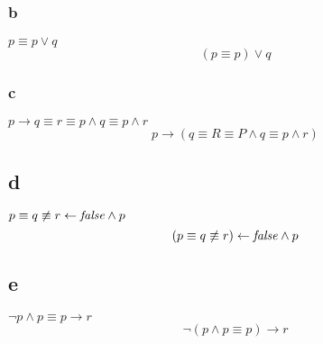 \documentclass{article}
\begin{document}
\subsubsection{b}
\begin{logicenv}{$p \equiv p \lor q$}
    \[(p \equiv p) \lor q\]
\end{logicenv}

\subsubsection{c}
\begin{logicenv}{$p \to q \equiv r \equiv p \land q \equiv p \land r$}
    \[p \to (q \equiv R \equiv P \land q \equiv p \land r)\]
\end{logicenv}

\subsection{d}
\begin{logicenv}{$p \equiv q \not\equiv r \gets \textrm{\textit{false}} \land p$}
    \[(p \equiv q \not\equiv r) \gets \textrm{\textit{false}} \land p\]
\end{logicenv}

\subsection{e}
\begin{logicenv}{$\neg p \land p \equiv p \to r$}
    \[\neg(p \land p \equiv p) \to r\]
\end{logicenv}
\end{document}

